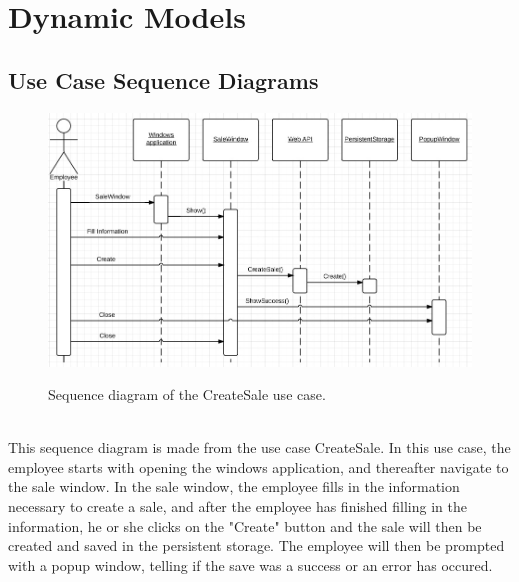 \section{Dynamic Models}

\subsection{Use Case Sequence Diagrams}
\begin{figure}[H]
	\centering
		\includegraphics[width=\textwidth]{Figures/SequenceDiagram-CreateSale}\\
	\caption{Sequence diagram of the CreateSale use case.}
  \label{fig:SequenceDiagram-CreateSale}
\end{figure}
\\
This sequence diagram is made from the use case CreateSale. In this use case, the employee starts with opening the windows application, and thereafter navigate to the sale window. In the sale window, the employee fills in the information necessary to create a sale, and after the employee has finished filling in the information, he or she clicks on the "Create" button and the sale will then be created and saved in the persistent storage. The employee will then be prompted with a popup window, telling if the save was a success or an error has occured.
\\

